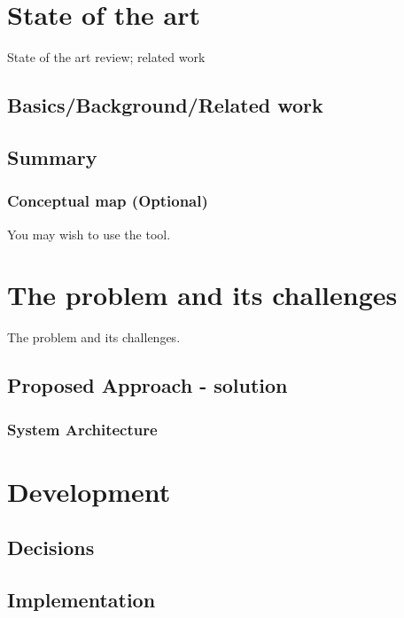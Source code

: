 \documentclass[
  oneside,
  11pt, a4paper,
  footinclude=true,
  headinclude=true,
  cleardoublepage=empty
]{scrbook}
\begin{document}

  \chapter{State of the art}
    State of the art review; related work

    \section{Basics/Background/Related work}

    \section{Summary}

      \subsection{Conceptual map (Optional)}
        You may wish to use the  tool.

  \chapter{The problem and its challenges}
    The problem and its challenges.

    \section{Proposed Approach - solution}

      \subsection{System Architecture}

  \chapter{Development}

    \section{Decisions}

    \section{Implementation}
\end{document}
